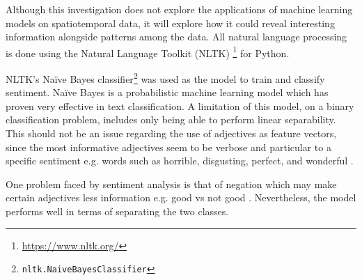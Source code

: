 Although this investigation does not explore the applications of machine learning models on spatiotemporal data, it will explore how it could reveal interesting information alongside patterns among the data. All natural language processing is done using the Natural Language Toolkit (NLTK)
\footnote{\url{https://www.nltk.org/}} for Python.

NLTK's Na\"ive Bayes classifier\footnote{\texttt{nltk.NaiveBayesClassifier}} was used as the model to train and classify sentiment. Na\"ive Bayes is a probabilistic machine learning model which has proven very effective in text classification. A limitation of this model, on a binary classification problem, includes only being able to perform linear separability. This should not be an issue regarding the use of adjectives as feature vectors, since the most informative adjectives seem to be verbose and particular to a specific sentiment e.g. words such as horrible, disgusting, perfect, and wonderful \cite{rish2001empirical}.

One problem faced by sentiment analysis is that of negation which may make certain adjectives less information e.g. good vs not good \cite{blanco2011some}. Nevertheless, the model performs well in terms of separating the two classes. %





